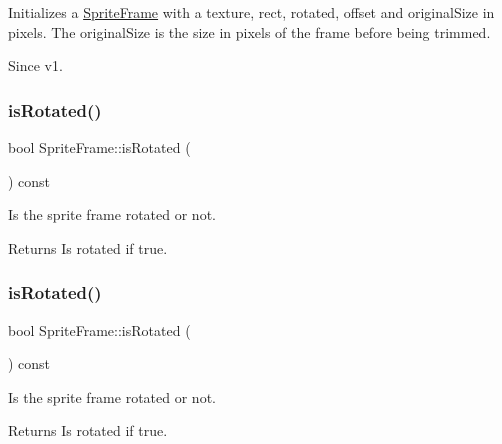 Initializes a \hyperlink{classSpriteFrame}{Sprite\+Frame} with a texture, rect, rotated, offset and original\+Size in pixels. The original\+Size is the size in pixels of the frame before being trimmed.

\begin{DoxySince}{Since}
v1. 
\end{DoxySince}
\mbox{\label{classSpriteFrame_adefd8284eab4b8582aef36e339ee4f29}} 
\subsubsection{\texorpdfstring{is\+Rotated()}{isRotated()}\hspace{0.1cm}{\footnotesize\ttfamily [1/2]}}
{\footnotesize\ttfamily bool Sprite\+Frame\+::is\+Rotated (\begin{DoxyParamCaption}{ }\end{DoxyParamCaption}) const\hspace{0.3cm}{\ttfamily [inline]}}

Is the sprite frame rotated or not.

\begin{DoxyReturn}{Returns}
Is rotated if true. 
\end{DoxyReturn}
\mbox{\label{classSpriteFrame_adefd8284eab4b8582aef36e339ee4f29}} 
\subsubsection{\texorpdfstring{is\+Rotated()}{isRotated()}\hspace{0.1cm}{\footnotesize\ttfamily [2/2]}}
{\footnotesize\ttfamily bool Sprite\+Frame\+::is\+Rotated (\begin{DoxyParamCaption}{ }\end{DoxyParamCaption}) const\hspace{0.3cm}{\ttfamily [inline]}}

Is the sprite frame rotated or not.

\begin{DoxyReturn}{Returns}
Is rotated if true. 
\end{DoxyReturn}
\mbox{\label{classSpriteFrame_a04d7b2e3d26984c6d47f82937cb226d1}} 
